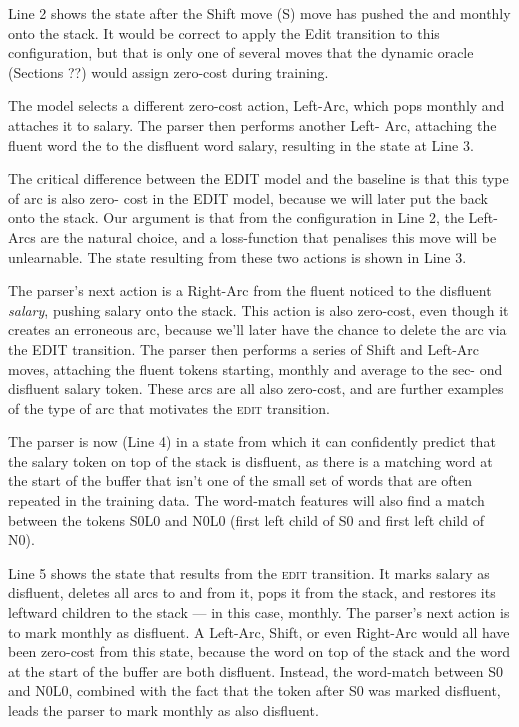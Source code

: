 \documentclass[11pt,letterpaper]{article}
\newcommand{\edittrans}{\textsc{edit}\xspace}
\begin{document}
Line 2 shows the state after the Shift move (S)
move has pushed the and monthly onto the stack. It would be correct to apply the
Edit transition to this configuration, but that is only one of several moves that
the dynamic oracle (Sections ??) would assign zero-cost during training.

The model selects a different zero-cost action, Left-Arc, which pops monthly and
attaches it to salary. The parser then performs another Left- Arc, attaching the
fluent word the to the disfluent word salary, resulting in the state at Line 3.

The critical difference between the EDIT model and the baseline is that this type
of arc is also zero- cost in the EDIT model, because we will later put the back
onto the stack. Our argument is that from the configuration in Line 2, the Left-Arcs
are the natural choice, and a loss-function that penalises this move will be
unlearnable. The state resulting from these two actions is shown in Line 3.

The parser’s next action is a Right-Arc from the fluent noticed to the disfluent
\emph{salary}, pushing salary onto the stack. This action is also zero-cost,
even though it creates an erroneous arc, because we’ll later have the chance to
delete the arc via the EDIT transition. The parser then performs a series of
Shift and Left-Arc moves, attaching the fluent tokens starting, monthly and
average to the sec- ond disfluent salary token. These arcs are all also zero-cost,
and are further examples of the type of arc that motivates the \edittrans transition.

The parser is now (Line 4) in a state from which it can confidently predict that
the salary token on top of the stack is disfluent, as there is a matching word at
the start of the buffer that isn’t one of the small set of words that are often
repeated in the training data. The word-match features will also find a match
between the tokens S0L0 and N0L0 (first left child of S0 and first left child
of N0).

Line 5 shows the state that results from the \edittrans transition. It marks salary as
disfluent, deletes all arcs to and from it, pops it from the stack, and restores
its leftward children to the stack — in this case, monthly. The parser’s next
action is to mark monthly as disfluent. A Left-Arc, Shift, or even Right-Arc
would all have been zero-cost from this state, because the word on top of the
stack and the word at the start of the buffer are both disfluent. Instead, the
word-match between S0 and N0L0, combined with the fact that the token after S0
was marked disfluent, leads the parser to mark monthly as also disfluent.
\end{document}
